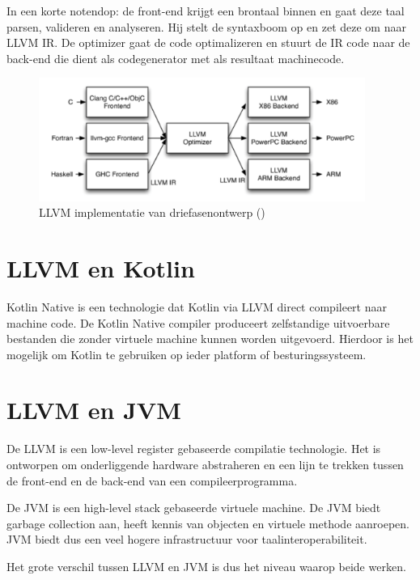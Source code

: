 In een korte notendop: de front-end krijgt een brontaal binnen en gaat deze taal parsen, valideren en analyseren. Hij stelt de syntaxboom op en zet deze om naar LLVM IR. De optimizer gaat de code optimalizeren en stuurt de IR code naar de back-end die dient als codegenerator met als resultaat machinecode.

\begin{figure} [ht]
	\centering
	\includegraphics[width=0.95\textwidth]{img/llvmirdriefasen}
	\caption{LLVM implementatie van driefasenontwerp (\cite{aosa})}
	\label{fig:llvmirdriefasen}
\end{figure}

\section{LLVM en Kotlin}
Kotlin Native is een technologie dat Kotlin via LLVM direct compileert naar machine code. De Kotlin Native compiler produceert zelfstandige uitvoerbare bestanden die zonder virtuele machine kunnen worden uitgevoerd. Hierdoor is het mogelijk om Kotlin te gebruiken op ieder platform of besturingssysteem.

\section{LLVM en JVM}
De LLVM is een low-level register gebaseerde compilatie technologie. Het is ontworpen om onderliggende hardware abstraheren en een lijn te trekken tussen de front-end en de back-end van een compileerprogramma.

De JVM is een high-level stack gebaseerde virtuele machine. De JVM biedt garbage collection aan, heeft kennis van objecten en virtuele methode aanroepen. JVM biedt dus een veel hogere infrastructuur voor taalinteroperabiliteit.

Het grote verschil tussen LLVM en JVM is dus het niveau waarop beide werken.
